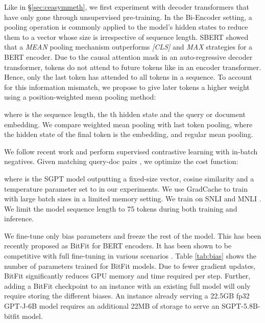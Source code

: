 \documentclass{article}
\begin{document}
Like in \S\ref{sec:ceasymmeth}, we first experiment with decoder transformers that have only gone through unsupervised pre-training. In the Bi-Encoder setting, a pooling operation is commonly applied to the model's hidden states to reduce them to a vector whose size is irrespective of sequence length. SBERT \citep{reimers2019sentence} showed that a \textit{MEAN} pooling mechanism outperforms \textit{[CLS]} and \textit{MAX} strategies for a BERT encoder. Due to the causal attention mask in an auto-regressive decoder transformer, tokens do not attend to future tokens like in an encoder transformer. Hence, only the last token has attended to all tokens in a sequence. To account for this information mismatch, we propose to give later tokens a higher weight using a position-weighted mean pooling method:



where  is the sequence length,  the th hidden state and  the query or document embedding. We compare weighted mean pooling with last token pooling, where the hidden state of the final token is the embedding, and regular mean pooling.

We follow recent work \cite{giorgi2020declutr, gao2021simcse,izacard2021towards, neelakantan2022text} and perform supervised contrastive learning with in-batch negatives. Given matching query-doc pairs , we optimize the cost function:



where  is the SGPT model outputting a fixed-size vector,  cosine similarity and  a temperature parameter set to  in our experiments. We use GradCache \cite{gao2021scaling} to train with large batch sizes in a limited memory setting. We train on SNLI \cite{bowman2015large} and MNLI \cite{williams2017broad}. We limit the model sequence length to 75 tokens during both training and inference.

We fine-tune only bias parameters and freeze the rest of the model. This has been recently proposed as BitFit \cite{zaken2021bitfit} for BERT encoders. It has been shown to be competitive with full fine-tuning in various scenarios \cite{hu2021lora, wang2021list, logan2021cutting}. Table \ref{tab:bias} shows the number of parameters trained for BitFit models. Due to fewer gradient updates, BitFit significantly reduces GPU memory and time required per step. Further, adding a BitFit checkpoint to an instance with an existing full model will only require storing the different biases. An instance already serving a 22.5GB fp32 GPT-J-6B model requires an additional 22MB of storage to serve an SGPT-5.8B-bitfit model.
\end{document}
